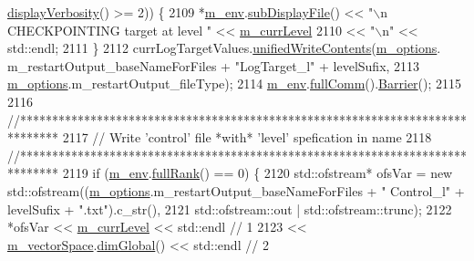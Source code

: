\begin{DoxyCode}
{      \hyperlink{class_q_u_e_s_o_1_1_base_environment_a1fe5f244fc0316a0ab3e37463f108b96}{displayVerbosity}() >= 2)) \{
2109     *\hyperlink{class_q_u_e_s_o_1_1_m_l_sampling_a13f1ca4fe9f94822fe572a743eaced1d}{m\_env}.\hyperlink{class_q_u_e_s_o_1_1_base_environment_a8a0064746ae8dddfece4229b9ad374d6}{subDisplayFile}() << \textcolor{stringliteral}{"\(\backslash\)n CHECKPOINTING target at level "} << 
      \hyperlink{class_q_u_e_s_o_1_1_m_l_sampling_af9416874c856e50f3b35270e801f17e4}{m\_currLevel}
2110                             << \textcolor{stringliteral}{"\(\backslash\)n"} << std::endl;
2111   \}
2112   currLogTargetValues.\hyperlink{class_q_u_e_s_o_1_1_scalar_sequence_a2f832dd5eda37df06eb52650ab8ce733}{unifiedWriteContents}(\hyperlink{class_q_u_e_s_o_1_1_m_l_sampling_af8504cc57ec72b3c52833826b2bfff8e}{m\_options}.
      m\_restartOutput\_baseNameForFiles + \textcolor{stringliteral}{"LogTarget\_l"} + levelSufix,
2113                                            \hyperlink{class_q_u_e_s_o_1_1_m_l_sampling_af8504cc57ec72b3c52833826b2bfff8e}{m\_options}.m\_restartOutput\_fileType);
2114   \hyperlink{class_q_u_e_s_o_1_1_m_l_sampling_a13f1ca4fe9f94822fe572a743eaced1d}{m\_env}.\hyperlink{class_q_u_e_s_o_1_1_base_environment_a0b0779b41ff304058856e97e1d16b4d4}{fullComm}().\hyperlink{class_q_u_e_s_o_1_1_mpi_comm_a4059971c30e023b272fccaa6aa00c426}{Barrier}();
2115 
2116   \textcolor{comment}{//******************************************************************************}
2117   \textcolor{comment}{// Write 'control' file *with* 'level' spefication in name}
2118   \textcolor{comment}{//******************************************************************************}
2119   \textcolor{keywordflow}{if} (\hyperlink{class_q_u_e_s_o_1_1_m_l_sampling_a13f1ca4fe9f94822fe572a743eaced1d}{m\_env}.\hyperlink{class_q_u_e_s_o_1_1_base_environment_a84a239e42ae443cf71db6e03e8159620}{fullRank}() == 0) \{
2120     std::ofstream* ofsVar = \textcolor{keyword}{new} std::ofstream((\hyperlink{class_q_u_e_s_o_1_1_m_l_sampling_af8504cc57ec72b3c52833826b2bfff8e}{m\_options}.m\_restartOutput\_baseNameForFiles + \textcolor{stringliteral}{"
      Control\_l"} + levelSufix + \textcolor{stringliteral}{".txt"}).c\_str(),
2121                                               std::ofstream::out | std::ofstream::trunc);
2122     *ofsVar << \hyperlink{class_q_u_e_s_o_1_1_m_l_sampling_af9416874c856e50f3b35270e801f17e4}{m\_currLevel}               << std::endl  \textcolor{comment}{// 1}
2123             << \hyperlink{class_q_u_e_s_o_1_1_m_l_sampling_a7bc4c72f65ba9166ed94a6e198b0915b}{m\_vectorSpace}.\hyperlink{class_q_u_e_s_o_1_1_vector_space_acd4359dc120905c22ca1064e33787239}{dimGlobal}() << std::endl  \textcolor{comment}{// 2}
}
\end{DoxyCode}
